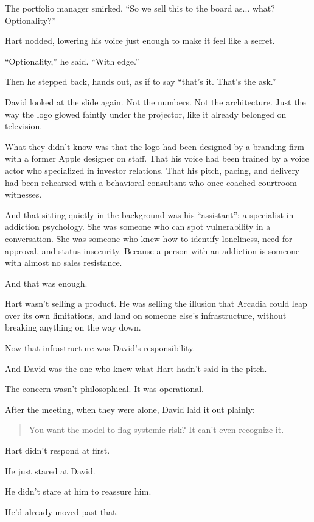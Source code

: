The portfolio manager smirked. ``So we sell this to the board as... what? Optionality?''

Hart nodded, lowering his voice just enough to make it feel like a secret.

``Optionality,'' he said. ``With edge.''

Then he stepped back, hands out, as if to say ``that’s it. That’s the ask.''

David looked at the slide again.  
Not the numbers.  
Not the architecture.  
Just the way the logo glowed faintly under the projector, like it already belonged on television.

What they didn’t know 
was that the logo had been designed by a branding firm with a former Apple designer on staff.
That his voice had been trained by a voice actor who specialized in investor relations.
That his pitch, pacing, and delivery had been rehearsed with a behavioral consultant who once coached courtroom witnesses.

And that sitting quietly in the background was his ``assistant'': a specialist in addiction psychology.
She was someone who can spot vulnerability in a conversation.
She was someone who knew how to identify loneliness, need for approval, and status insecurity.
Because a person with an addiction is someone with almost no sales resistance.

And that was enough.

Hart wasn’t selling a product.
He was selling the illusion that Arcadia could leap over its own limitations, and land on someone else’s infrastructure, 
without breaking anything on the way down.

Now that infrastructure was David’s responsibility.

And David was the one who knew what Hart hadn’t said in the pitch.

The concern wasn’t philosophical. It was operational.

After the meeting, when they were alone, David laid it out plainly:

\begin{quote}
  You want the model to flag systemic risk? It can’t even recognize it. 
\end{quote}

Hart didn’t respond at first.

He just stared at David.

He didn't stare at him to reassure him. 

He’d already moved past that.

